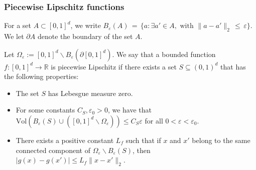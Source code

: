 \documentclass[twoside,11pt]{article}
\begin{document}
\subsubsection{Piecewise Lipschitz functions}
\label{plf_notation}

\begin{definition}
\label{def_S}
    For a set \( A \subset [0,1]^d \), we write \( B_{\varepsilon}(A) \,=\, \{a : \exists a' \in A, \text{ with } \|a - a'\|_2 \,\leq\, \varepsilon\} \). We let \( \partial A \) denote the boundary of the set \( A \).

Let \( \Omega_{\varepsilon} := [0,1]^d \backslash B_{\varepsilon}(\partial[0,1]^d) \). We say that a bounded function \( f : [0,1]^d \rightarrow \mathbb{R} \) is piecewise Lipschitz if there exists a set \( S \subseteq (0,1)^d \) that has the following properties:

\begin{itemize}
  \item The set \( S \) has Lebesgue measure zero.
  \item For some constants \( C_S, \varepsilon_0 > 0 \), we have that \( \text{Vol} (B_{\varepsilon}(S) \cup ([0,1]^d \backslash \Omega_{\varepsilon})) \leq  C_S\varepsilon \) for all \( 0 < \varepsilon < \varepsilon_0 \).
  \item There exists a positive constant \( L_f \) such that if \( x \) and \( x' \) belong to the same connected component of \( \Omega_{\varepsilon} \backslash B_{\varepsilon}(S) \), then \( |g(x) - g(x')| \leq  L_f \|x - x'\|_2 \).
\end{itemize}

\end{definition}






\end{document}
